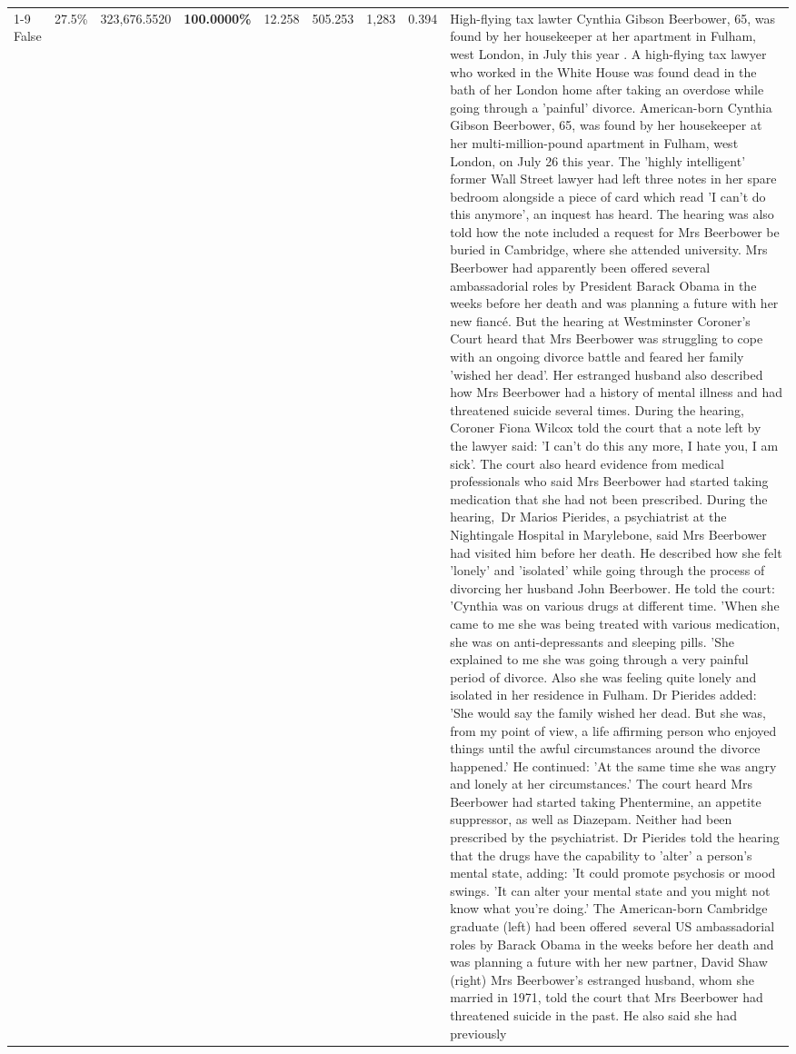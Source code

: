 \begin{table}[H]
\begin{tabular}{lllrlllll}
\cline{1-9}
False & 27.5\% & 323,676.5520 & \bfseries \color{red} 100.0000\% & 12.258 & 505.253 & 1,283 & 0.394 & High-flying tax lawter Cynthia Gibson Beerbower, 65, was found by her housekeeper at her apartment in Fulham, west London, in July this year . A high-flying tax lawyer who worked in the White House was found dead in the bath of her London home after taking an overdose while going through a 'painful' divorce. American-born Cynthia Gibson Beerbower, 65, was found by her housekeeper at her multi-million-pound apartment in Fulham, west London, on July 26 this year. The 'highly intelligent' former Wall Street lawyer had left three notes in her spare bedroom alongside a piece of card which read 'I can't do this anymore', an inquest has heard. The hearing was also told how the note included a request for Mrs Beerbower be buried in Cambridge, where she attended university. Mrs Beerbower had apparently been offered several ambassadorial roles by President Barack Obama in the weeks before her death and was planning a future with her new fiancé. But the hearing at Westminster Coroner's Court heard that Mrs Beerbower was struggling to cope with an ongoing divorce battle and feared her family 'wished her dead'. Her estranged husband also described how Mrs Beerbower had a history of mental illness and had threatened suicide several times. During the hearing, Coroner Fiona Wilcox told the court that a note left by the lawyer said: 'I can't do this any more, I hate you, I am sick'. The court also heard evidence from medical professionals who said Mrs Beerbower had started taking medication that she had not been prescribed. During the hearing, Dr Marios Pierides, a psychiatrist at the Nightingale Hospital in Marylebone, said Mrs Beerbower had visited him before her death. He described how she felt 'lonely' and 'isolated' while going through the process of divorcing her husband John Beerbower. He told the court: 'Cynthia was on various drugs at different time. 'When she came to me she was being treated with various medication, she was on anti-depressants and sleeping pills. 'She explained to me she was going through a very painful period of divorce. Also she was feeling quite lonely and isolated in her residence in Fulham. Dr Pierides added: 'She would say the family wished her dead. But she was, from my point of view, a life affirming person who enjoyed things until the awful circumstances around the divorce happened.' He continued: 'At the same time she was angry and lonely at her circumstances.' The court heard Mrs Beerbower had started taking Phentermine, an appetite suppressor, as well as Diazepam. Neither had been prescribed by the psychiatrist. Dr Pierides told the hearing that the drugs have the capability to 'alter' a person's mental state, adding: 'It could promote psychosis or mood swings. 'It can alter your mental state and you might not know what you're doing.' The American-born Cambridge graduate (left) had been offered several US ambassadorial roles by Barack Obama in the weeks before her death and was planning a future with her new partner, David Shaw (right) Mrs Beerbower's estranged husband, whom she married in 1971, told the court that Mrs Beerbower had threatened suicide in the past. He also said she had previously 
\end{tabular}
\end{table}
